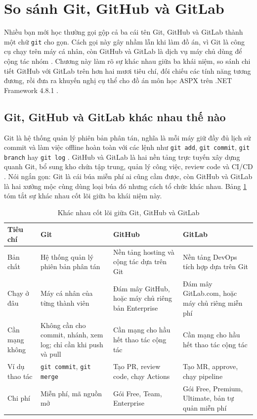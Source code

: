 \section{So sánh Git, GitHub và GitLab}

Nhiều bạn mới học thường gọi gộp cả ba cái tên Git, GitHub và GitLab thành một chữ \texttt{git} cho gọn.
Cách gọi này gây nhầm lẫn khi làm đồ án, vì Git là công cụ chạy trên máy cá nhân,
còn GitHub và GitLab là dịch vụ máy chủ dùng để cộng tác nhóm \cite{progit,atlassiangit}.
Chương này làm rõ sự khác nhau giữa ba khái niệm, so sánh chi tiết GitHub với GitLab
trên hơn hai mươi tiêu chí, đối chiếu các tính năng tương đương,
rồi đưa ra khuyến nghị cụ thể cho đồ án môn học ASPX trên .NET Framework 4.8.1 \cite{msnetfx}.

\subsection{Git, GitHub và GitLab khác nhau thế nào}

Git là hệ thống quản lý phiên bản phân tán, nghĩa là mỗi máy giữ đầy đủ lịch sử commit
và làm việc offline hoàn toàn với các lệnh như \verb|git add|, \verb|git commit|,
\verb|git branch| hay \verb|git log| \cite{progit}.
GitHub và GitLab là hai nền tảng trực tuyến xây dựng quanh Git, bổ sung kho chứa tập trung,
quản lý công việc, review code và CI/CD \cite{githubdocs,gitlabdocs}.
Nói ngắn gọn: Git là cái búa miễn phí ai cũng cầm được,
còn GitHub và GitLab là hai xưởng mộc cùng dùng loại búa đó nhưng cách tổ chức khác nhau.
Bảng \ref{tab:c6-khai-niem} tóm tắt sự khác nhau cốt lõi giữa ba khái niệm này.

\begin{table}[H]
\centering
\caption{Khác nhau cốt lõi giữa Git, GitHub và GitLab}
\label{tab:c6-khai-niem}
\begin{tabular}{p{2.4cm}p{3.7cm}p{3.7cm}p{3.7cm}}
\toprule
Tiêu chí & Git & GitHub & GitLab \\
\midrule
Bản chất & Hệ thống quản lý phiên bản phân tán \cite{progit} & Nền tảng hosting và cộng tác dựa trên Git \cite{githubdocs} & Nền tảng DevOps tích hợp dựa trên Git \cite{gitlabdocs} \\
Chạy ở đâu & Máy cá nhân của từng thành viên & Đám mây GitHub, hoặc máy chủ riêng bản Enterprise & Đám mây GitLab.com, hoặc máy chủ riêng miễn phí \\
Cần mạng không & Không cần cho commit, nhánh, xem log; chỉ cần khi push và pull & Cần mạng cho hầu hết thao tác cộng tác & Cần mạng cho hầu hết thao tác cộng tác \\
Ví dụ thao tác & \verb|git commit|, \verb|git merge| & Tạo PR, review code, chạy Actions & Tạo MR, approve, chạy pipeline \\
Chi phí & Miễn phí, mã nguồn mở & Gói Free, Team, Enterprise & Gói Free, Premium, Ultimate, bản tự quản miễn phí \\
\bottomrule
\end{tabular}
\end{table}

